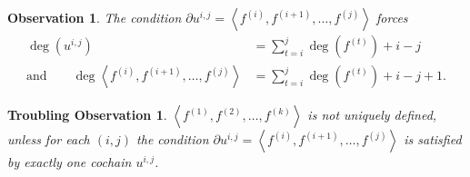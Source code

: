 \documentclass[12pt]{article}
\newtheorem{observation}[definition]{Observation}
\newtheorem{trouble}[definition]{Troubling Observation}
\begin{document}
\begin{observation}\label{degree}
The  condition $\partial u^{i,j}
=\left\langle f^{\left(i\right)},
f^{\left(i+1\right)},\dots,f^{\left(j\right)}\right\rangle$ forces
\begin{align*}
\deg\left(u^{i,j}\right)
&=\sum_{t=i}^j \deg\left(f^{\left(t\right)}\right) +i-j\\
\text{and}\qquad\deg\left\langle f^{\left(i\right)},
f^{\left(i+1\right)},\dots,f^{\left(j\right)}\right\rangle
&=\sum_{t=i}^j \deg\left(f^{\left(t\right)}\right) +i-j+1.
\end{align*}
\end{observation}

\begin{trouble}
$\left\langle f^{\left(1\right)},
f^{\left(2\right)},\dots,f^{\left(k\right)}\right\rangle$
is not uniquely defined, unless for each $\left(i,j\right)$
the condition
$\partial u^{i,j}=\left\langle f^{\left(i\right)},
f^{\left(i+1\right)},\dots,f^{\left(j\right)}\right\rangle$
is satisfied by exactly one cochain $u^{i,j}$.
\end{trouble}
\end{document}
